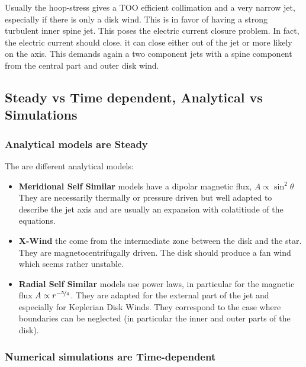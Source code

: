 \documentclass[10pt,a4paper,english]{article}
\begin{document}
Usually the hoop-stress gives a TOO efficient collimation and a very narrow
jet, especially if there is only a disk wind. This is in favor of having a
strong turbulent inner spine jet. This poses the electric current closure
problem. In fact, the electric current should close. it can close either out of
the jet or more likely  on the axis. This demands again a two component jets
with a spine component  from the central part and outer disk wind.

\subsection{Steady vs Time dependent, Analytical vs Simulations}

\subsubsection{Analytical models are Steady}

The are different analytical models:
\begin{itemize}
    \item \textbf{Meridional Self Similar} models have a dipolar magnetic flux,
          $A \propto \sin^2\theta$ They are necessarily thermally or pressure
          driven but well adapted to describe the jet axis and are usually an
          expansion with colatitiude of the equations.
    \item \textbf{X-Wind} the come from the intermediate zone between the disk
          and the star. They are magnetocentrifugally driven. The disk should
          produce a fan wind which seems rather unstable.
    \item \textbf{Radial Self Similar} models use power laws, in particular for
          the magnetic flux $A \propto r^{-\nicefrac{5}{4}}$. They are adapted
          for the external part of the jet and especially for Keplerian Disk
          Winds. They correspond to the case where boundaries can be neglected
          (in particular the inner and outer parts of the disk).
\end{itemize}

\subsubsection{Numerical simulations are Time-dependent}
\end{document}
